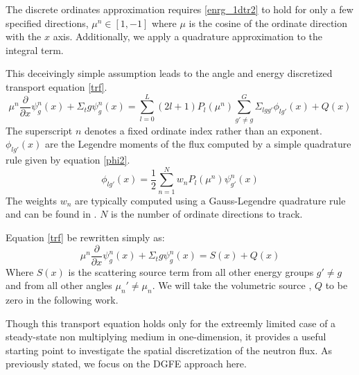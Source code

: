 The discrete ordinates approximation requires \ref{enrg_1dtr2} to hold for only a few specified directions, $\mu^n \in [1, -1]$ where $\mu$ is the cosine of the ordinate direction with the $x$ axis.  Additionally, we apply a quadrature approximation to the integral term.

This deceivingly simple assumption leads to the angle and energy discretized transport equation \ref{trf}.
\begin{equation}
\mu^n \frac{\partial}{\partial x} \psi^n_{g}(x) + \Sigma_tg \psi^n_g(x) =
\sum_{l=0}^L (2l+1) P_l(\mu^n) 
\sum_{g'\neq g}^G \Sigma_{lgg'} \phi_{lg'}(x)
 + Q(x)
\label{trf}
\end{equation}
The superscript $n$ denotes a fixed ordinate index rather than an exponent.
$\phi_{lg'}(x)$ are the Legendre moments of the flux computed by a simple quadrature rule given by equation \ref{phi2}.
\begin{equation}
\phi_{lg'}(x) = \frac{1}{2}\sum_{n=1}^N w_n P_l(\mu^n)\psi^n_{g'}(x)
\label{phi2}
\end{equation}
The weights $w_n$ are typically computed using a Gauss-Legendre quadrature rule and can be found in \cite{Lewis}.  $N$ is the number of ordinate directions to track.

Equation \ref{trf} be rewritten simply as:
\begin{equation}
\mu^n \frac{\partial}{\partial x} \psi^n_{g}(x) + \Sigma_tg \psi^n_g(x) = S(x) + Q(x)
\label{g_mu_treq}
\end{equation}
Where $S(x)$ is the scattering source term from all other energy groups $g' \neq g$ and from all other angles $\mu_n' \ne \mu_n$.  We will take the volumetric source , $Q$ to be zero in the following work.

Though this transport equation holds only for the extreemly limited case of a steady-state non multiplying medium in one-dimension, it provides a useful starting point to investigate the spatial discretization of the neutron flux.
As previously stated, we focus on the DGFE approach here.
